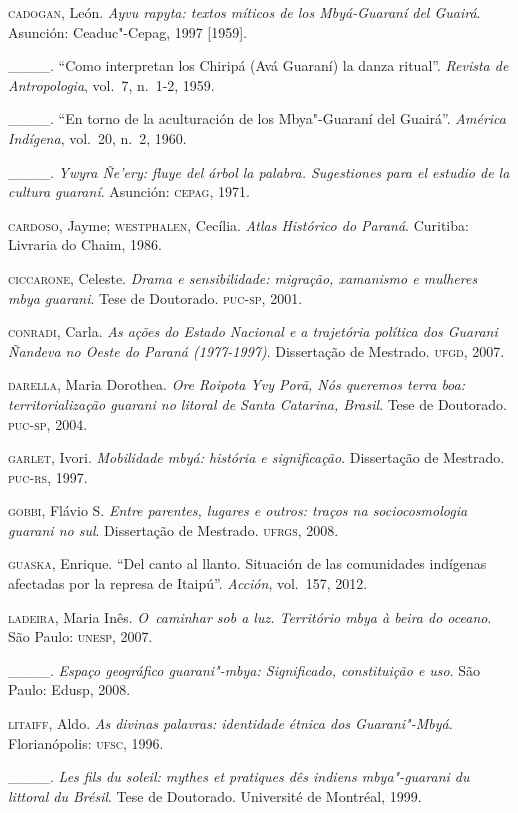 \begin{Parskip}
\textsc{cadogan}, León. \emph{Ayvu rapyta: textos míticos de los Mbyá-Guaraní del
Guairá}. Asunción: Ceaduc"-Cepag, 1997 [1959].

\_\_\_\_. ``Como interpretan los Chiripá (Avá Guaraní) la
danza ritual''. \emph{Revista de Antropologia}, vol.~7, n.~1-2, 1959.

\_\_\_\_. ``En torno de la aculturación de los Mbya"-Guaraní
del Guairá''. \emph{América Indígena}, vol.~20, n.~2, 1960. 

\_\_\_\_. \emph{Ywyra Ñe’ery: fluye del árbol la palabra.
Sugestiones para el estudio de la cultura guaraní}. Asunción: \textsc{cepag},
1971.

\textsc{cardoso}, Jayme; \textsc{westphalen}, Cecília. \emph{Atlas Histórico do Paraná}.
Curitiba: Livraria do Chaim, 1986.

\textsc{ciccarone}, Celeste. \emph{Drama e sensibilidade: migração, xamanismo e
mulheres mbya guarani}. Tese de Doutorado. \textsc{puc}-\textsc{sp}, 2001.

\textsc{conradi}, Carla. \emph{As ações do Estado Nacional e a
trajetória política dos Guarani Ñandeva no Oeste do Paraná (1977-1997)}.
Dissertação de Mestrado. \textsc{ufgd}, 2007.

\textsc{darella}, Maria Dorothea. \emph{Ore Roipota Yvy Porã, Nós queremos terra boa:
territorialização guarani no litoral de Santa Catarina, Brasil}. Tese de
Doutorado. \textsc{puc}-\textsc{sp}, 2004.

\textsc{garlet}, Ivori. \emph{Mobilidade mbyá: história e significação}.
Dissertação de Mestrado. \textsc{puc}-\textsc{rs}, 1997.

\textsc{gobbi}, Flávio S. \emph{Entre parentes, lugares e outros: traços na
sociocosmologia guarani no sul}. Dissertação de Mestrado. \textsc{ufrgs}, 2008.

\textsc{guaska}, Enrique. ``Del canto al llanto. Situación de las comunidades
indígenas afectadas por la represa de Itaipú''. \emph{Acción}, vol.~157, 2012.

\textsc{ladeira}, Maria Inês. \emph{O~caminhar sob a luz. Território mbya à
beira do oceano}. São Paulo: \textsc{unesp}, 2007.

\_\_\_\_. \emph{Espaço geográfico guarani"-mbya: Significado,
constituição e uso}. São Paulo: Edusp, 2008.

\textsc{litaiff}, Aldo. \emph{As divinas palavras: identidade étnica dos Guarani"-Mbyá}.
Florianópolis: \textsc{ufsc}, 1996.

\_\_\_\_. \emph{Les fils du soleil: mythes et pratiques dês
indiens mbya"-guarani du littoral du Brésil}. Tese de Doutorado.
Université de Montréal, 1999.


\end{Parskip}
